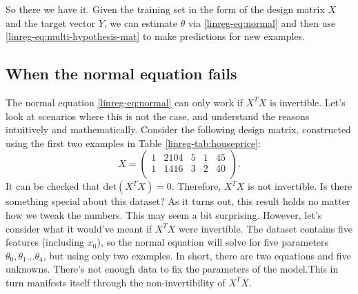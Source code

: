 \documentclass{article}
\theoremstyle{definition}
\begin{document}
So there we have it. Given the training set in the form of the design matrix $X$ and the target vector $Y$, we can estimate $\theta$ via \eqref{linreg-eq:normal} and then use \eqref{linreg-eq:multi-hypothesis-mat} to make predictions for new examples.


\subsection{When the normal equation fails}
The normal equation \eqref{linreg-eq:normal} can only work if $X^TX$ is invertible. Let's look at scenarios where this is not the case, and understand the reasons intuitively and mathematically. Consider the following design matrix, constructed using the first two examples in Table \ref{linreg-tab:houseprice}:
\begin{equation}
    X =
    \begin{pmatrix}
        1 & 2104 & 5 & 1 & 45 \\
        1 & 1416 & 3 & 2 & 40 \\
    \end{pmatrix}.
    \label{linreg-eq:design-mat-noninvert}
\end{equation}
It can be checked that $\text{det}(X^TX)=0$. Therefore, $X^TX$ is not invertible. Is there something special about this dataset? As it turns out, this result holds no matter how we tweak the numbers. This may seem a bit surprising. However, let's consider what it would've meant if $X^TX$ were invertible. The dataset contains five features (including $x_0$), so the normal equation will solve for five parameters $\theta_0,\theta_1\dots\theta_4$, but using only two examples. In short, there are two equations and five unknowns. There's not enough data to fix the parameters of the model.This in turn manifests itself through the non-invertibility of $X^TX$.
\end{document}
